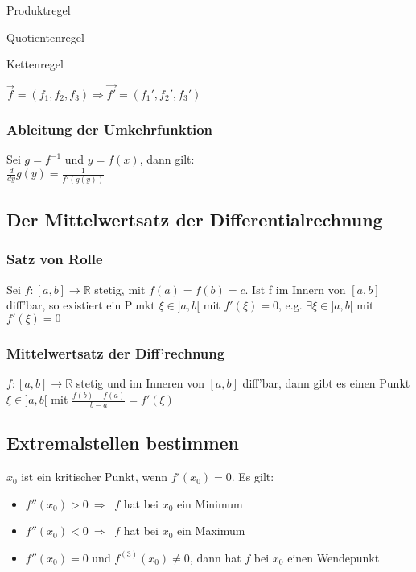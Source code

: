 \documentclass[10pt, a4paper, twocolumn]{scrartcl}
\begin{document}
\begin{description}
 \item[$(f+g)'=f'+g'$]
 \item[$(cf)'=c\cdotp f'$]
 \item[$(f\cdotp g)'=f'g+fg'$] Produktregel
 \item[$(\frac{f}{g})'=\frac{f'g-fg'}{g^2}$] Quotientenregel
 \item[$(f(g(x)))'=f'(g(x))\cdotp g'(x)$] Kettenregel
 \item$\vec{f}=(f_1,f_2,f_3)\Rightarrow \vec{f'}=(f_1',f_2',f_3')$
\end{description}

\subsubsection{Ableitung der Umkehrfunktion}
Sei $g=f^{-1}$ und $y=f(x)$, dann gilt:\\
$\frac{d}{dy}g(y)=\frac{1}{f'(g(y))}$


\subsection{Der Mittelwertsatz der Differentialrechnung}

\subsubsection{Satz von Rolle}
Sei $f:[a,b]\to{\mathbb{R}}$ stetig, mit $f(a)=f(b)=c$. Ist f im Innern von $[a,b]$ diff'bar, so existiert ein Punkt $\xi\in ]a,b[$ mit $f'(\xi)=0$, e.g. $\exists\xi\in]a,b[$ mit $f'(\xi)=0$\\

\subsubsection{Mittelwertsatz der Diff'rechnung}
$f:[a,b]\to\mathbb{R}$ stetig und im Inneren von $[a,b]$ diff'bar, dann gibt es einen Punkt $\xi\in]a,b[$ mit $\frac{f(b)-f(a)}{b-a}=f'(\xi)$

\subsection{Extremalstellen bestimmen}

$x_0$ ist ein kritischer Punkt, wenn $f'(x_0)=0$. Es gilt:
\begin{itemize}
 \item $f''(x_0)>0\:\Rightarrow\:$ $f$ hat bei $x_0$ ein Minimum
 \item $f''(x_0)<0\:\Rightarrow\:$ $f$ hat bei $x_0$ ein Maximum
 \item $f''(x_0)=0$ und $f^{(3)}(x_0)\neq 0$, dann hat $f$ bei $x_0$ einen Wendepunkt
\end{itemize}
\end{document}
